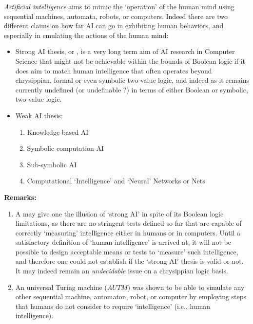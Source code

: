 \documentclass[12pt]{article}
\begin{document}
\emph{Artificial intelligence} aims to mimic the `operation' of the human mind using sequential machines, automata, robots, or computers. Indeed there are two different claims on how far AI can go in exhibiting human behaviors, and especially in emulating the actions of the human mind:

\begin{itemize}
\item Strong AI thesis, or 
, 
is a very long term aim of AI research in Computer Science that might not be achievable
within the bounds of Boolean logic if it does aim to match human intelligence that often operates
beyond chrysippian, formal or even symbolic two-value logic, and indeed as it remains currently undefined (or undefinable ?) in terms of either Boolean or symbolic, two-value logic. \\
\bigbreak

\item Weak AI thesis: 

\begin{enumerate}
\item Knowledge-based AI 

\item Symbolic computation AI

\item Sub-symbolic AI

\item Computational `Intelligence' and `Neural' Networks or Nets

\end{enumerate}

\end{itemize}

{\bf Remarks:}
\begin{enumerate}
\item A  may give one the illusion of `strong AI' in spite of its
Boolean logic limitations, as there are no stringent tests defined so far that are capable of correctly `measuring' intelligence either in humans or in computers. Until a satisfactory definition of `human intelligence' is arrived at, it will not
be possible to design acceptable means or tests to `measure' such intelligence, and therefore one could not establish
if the `strong AI' thesis is valid or not. It may indeed remain an {\em undecidable} issue on a chrysippian logic basis.

\item An universal Turing machine ({\em $AUTM$}) was shown to be able to simulate any other sequential machine, automaton, robot, or computer by employing steps that humans do not consider to require `intelligence' (i.e., 
human intelligence). 

\end{enumerate}


\end{document}
